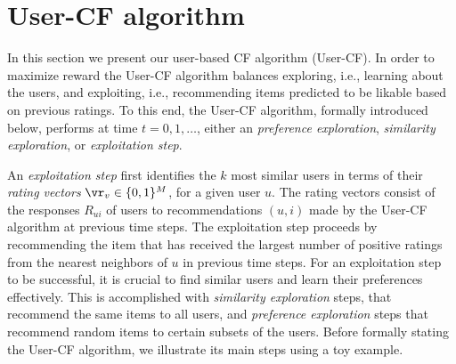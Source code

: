 \documentclass{article}
\newcommand\nitem{M}
\newcommand\vocrating{\vr}
\newcommand\ocR{R}
\begin{document}
\section{
\label{sec:algformal}
User-CF algorithm%
}
In this section we present our user-based CF algorithm (User-CF). 
In order to maximize reward the User-CF algorithm balances exploring, i.e., learning about the users, and exploiting, i.e., recommending items predicted to be likable based on previous ratings. 
To this end, the User-CF algorithm, formally introduced below, 
performs at time $t=0,1,\ldots$, either an \emph{preference exploration}, \emph{similarity exploration}, or \emph{exploitation step}. 

An \emph{exploitation step} first identifies the $k$ most similar users 
in terms of their \emph{rating vectors} $\vocrating_v \in \{0,1\}^\nitem$, for a given user $u$.  
The rating vectors consist of the responses $\ocR_{ui}$ of users to recommendations $(u,i)$ made by the User-CF algorithm at previous time steps. 
The exploitation step proceeds by recommending the item that has received the largest number of positive ratings from the nearest neighbors of $u$ in previous time steps. 
For an exploitation step to be successful, it is crucial to find similar users and learn their preferences effectively.  
This is accomplished with \emph{similarity exploration} steps, that recommend the same items to all users, and \emph{preference exploration} steps that recommend random items to certain subsets of the users. 
Before formally stating the User-CF algorithm, we illustrate its main steps using a toy example. 
 
\end{document}
